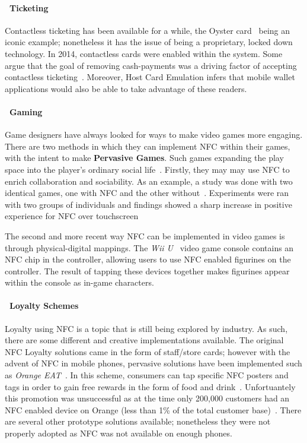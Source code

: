 \paragraph{\textbullet~Ticketing}
Contactless ticketing has been available for a while, the Oyster card~\cite{oystercosts} being an iconic example; nonetheless it has the issue of being a proprietary, locked down technology. In 2014, contactless cards were enabled within the system. Some argue that the goal of removing cash-payments was a driving factor of accepting contactless ticketing~\cite{oystercosts}. Moreover, Host Card Emulation infers that mobile wallet applications would also be able to take advantage of these readers.
\paragraph{\textbullet~Gaming}
Game designers have always looked for ways to make video games more engaging. There are two methods in which they can implement NFC within their games, with the intent to make \textbf{Pervasive Games}. Such games expanding the play space into the player's ordinary social life~\cite{montola2005exploring}. Firstly, they may may use NFC to enrich collaboration and sociability. As an example, a study was done with two identical games, one with NFC and the other without~\cite{wolbert2013evaluating}. Experiments were ran with two groups of individuals and findings showed a sharp increase in positive experience for NFC over touchscreen~\cite{wolbert2013evaluating} 

The second and more recent way NFC can be implemented in video games is through physical-digital mappings. The \emph{Wii U}~\cite{nintendo} video game console contains an NFC chip in the controller, allowing users to use NFC enabled figurines on the controller. The result of tapping these devices together makes figurines appear within the console as in-game characters. 

\paragraph{\textbullet~Loyalty Schemes}
Loyalty using NFC is a topic that is still being explored by industry. As such, there are some different and creative implementations available. The original NFC Loyalty solutions came in the form of staff/store cards; however with the advent of NFC in mobile phones, pervasive solutions have been implemented such as \emph{Orange EAT}~\cite{orangeEat}.  In this scheme, consumers can tap specific NFC posters and tags in order to gain free rewards in the form of food and drink~\cite{orange}. Unfortuantely this promotion was unsuccessful as at the time only 200,000 customers had an NFC enabled device on Orange (less than 1\% of the total customer base)~\cite{orange}. There are several other prototype solutions available; nonetheless they were not properly adopted as NFC was not available on enough phones.
